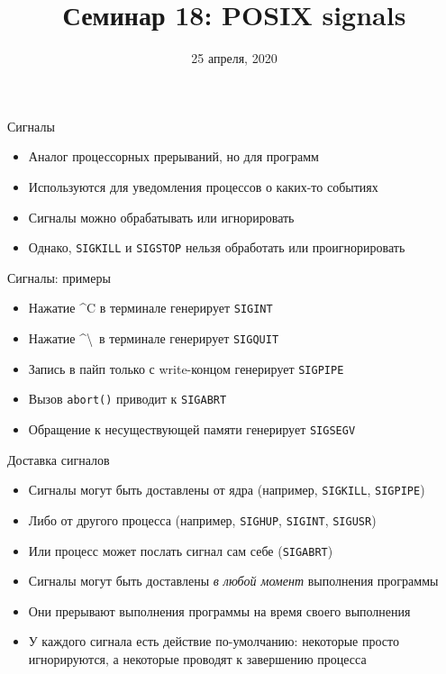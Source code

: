 \documentclass[10pt,pdf,hyperref={unicode}]{beamer}
\title{Семинар 18: POSIX signals}
\date{25 апреля, 2020}
\begin{document}
\begin{frame}
  \titlepage
\end{frame}

\begin{frame}{Сигналы}
\begin{itemize}
    \item Аналог процессорных прерываний, но для программ
    \item Используются для уведомления процессов о каких-то событиях
    \item Сигналы можно обрабатывать или игнорировать
    \item Однако, \texttt{SIGKILL} и \texttt{SIGSTOP} нельзя обработать или проигнорировать
\end{itemize}
\end{frame}

\begin{frame}{Сигналы: примеры}
\begin{itemize}
    \item Нажатие \textasciicircum C в терминале генерирует \texttt{SIGINT}
    \item Нажатие \textasciicircum\textbackslash \, в терминале генерирует \texttt{SIGQUIT}
    \item Запись в пайп только с write-концом генерирует \texttt{SIGPIPE}
    \item Вызов \texttt{abort()} приводит к \texttt{SIGABRT}
    \item Обращение к несуществующей памяти генерирует \texttt{SIGSEGV}
\end{itemize}
\end{frame}

\begin{frame}{Доставка сигналов}
\begin{itemize}
    \item Сигналы могут быть доставлены от ядра (например, \texttt{SIGKILL}, \texttt{SIGPIPE})
    \item Либо от другого процесса (например, \texttt{SIGHUP}, \texttt{SIGINT}, \texttt{SIGUSR})
    \item Или процесс может послать сигнал сам себе (\texttt{SIGABRT})
    \item Сигналы могут быть доставлены \emph{в любой момент} выполнения программы
    \item Они прерывают выполнения программы на время своего выполнения
    \item У каждого сигнала есть действие по-умолчанию: некоторые просто игнорируются, а некоторые проводят к завершению процесса
\end{itemize}
\end{frame}
\end{document}
